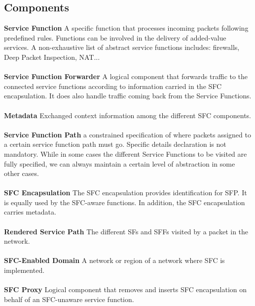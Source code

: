 \subsection{Components}
\vspace*{0.5cm}
\textbf{Service Function} A specific function that processes incoming packets following predefined rules. Functions can be involved in the delivery of added-value services. A non-exhaustive list of abstract service functions includes: firewalls, Deep Packet Inspection, NAT...\\
\\
\textbf{Service Function Forwarder} A logical component that forwards traffic to the connected
service functions according to information carried in the SFC
encapsulation. It does also handle traffic coming back from the
Service Functions.\\ 
\\
\textbf{Metadata} Exchanged context information among the different SFC components.\\
\\
\textbf{Service Function Path} a
constrained specification of where packets assigned to a certain
service function path must go. Specific details declaration is not mandatory. While in some cases the different Service Functions to be visited are fully specified, we can always maintain a certain level of abstraction in some other cases.\\
\\
\textbf{SFC Encapsulation} The SFC encapsulation  provides identification for SFP. It is equally  used by the SFC-aware functions. In addition, the SFC encapsulation carries metadata.\\
\\
\textbf{Rendered Service Path}  The different SFs and SFFs visited by a packet in the network.\\
\\
\textbf{SFC-Enabled Domain} A network or region of a network where SFC is implemented.\\
\\
\textbf{SFC Proxy} Logical component that removes and inserts SFC encapsulation on behalf of an     SFC-unaware service function.
